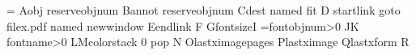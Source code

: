 \documentclass{article}
\begin{document}
=\font
A\pdfextension obj reserveobjnum B\pdfextension annot reserveobjnum C\pdfextension dest name{d} fit D%
\pdfextension startlink goto file{x.pdf} name{d} newwindow E\pdfextension endlink F%
G\edef\y{\pdffeedback fontsize}\y I%
=\pdffeedback fontobjnum\font\relax\ifnum{}>0 J\fi K%
\ifnum\pdffeedback fontname\font>0 L\fi M\pdfextension colorstack 0 pop N
O\pdffeedback lastximagepages P\pdffeedback lastximage Q\pdffeedback lastxform R
\end{document}
